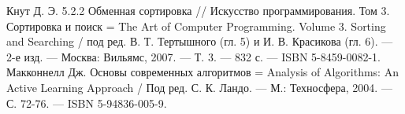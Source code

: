 \documentclass[a4paper, 14pt]{article}
\begin{document}
    \begin{center}
    	\newpage
\newpage
{}

\begin{thebibliography}{11} 
    Кнут Д. Э. 5.2.2 Обменная сортировка // Искусство программирования. Том 3. Сортировка и поиск = The Art of Computer Programming. Volume 3. Sorting and Searching / под ред. В. Т. Тертышного (гл. 5) и И. В. Красикова (гл. 6). — 2-е изд. — Москва: Вильямс, 2007. — Т. 3. — 832 с. — ISBN 5-8459-0082-1.
      Макконнелл Дж. Основы современных алгоритмов = Analysis of Algorithms: An Active Learning Approach / Под ред. С. К. Ландо. — М.: Техносфера, 2004. — С. 72-76. — ISBN 5-94836-005-9.
        
    \end{thebibliography}
	\newpage
	
	
    \end{center}        
\end{document}
